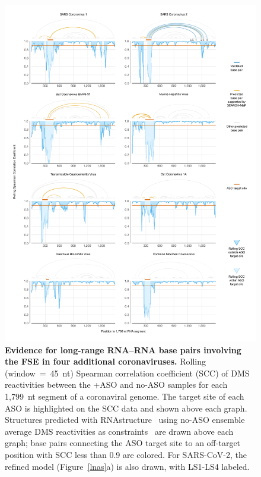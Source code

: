 \documentclass[main.tex]{subfiles}
\begin{document}
\begin{figure}[H]
	\includegraphics[width=\textwidth]{../MainFigures/covs/covs.png}
	\caption{\textbf{Evidence for long-range RNA--RNA base pairs involving the FSE in four additional coronaviruses.} Rolling (window~=~45~nt) Spearman correlation coefficient (SCC) of DMS reactivities between the +ASO and no-ASO samples for each 1,799~nt segment of a coronaviral genome. The target site of each ASO is highlighted on the SCC data and shown above each graph. Structures predicted with RNAstructure~\cite{Reuter2010} using no-ASO ensemble average DMS reactivities as constraints~\cite{Cordero2012} are drawn above each graph; base pairs connecting the ASO target site to an off-target position with SCC less than 0.9 are colored. For SARS-CoV-2, the refined model (Figure~\ref{lnas}a) is also drawn, with LS1-LS4 labeled.}
	\label{covs}
\end{figure}
\end{document}

